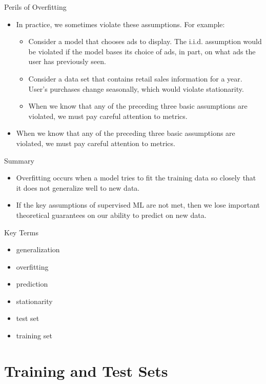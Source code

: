 \documentclass{beamer}
\begin{document}
\begin{frame}{Perils of Overfitting}
\begin{itemize}
    \item In practice, we sometimes violate these assumptions. For example:
    \begin{itemize}
        \item Consider a model that chooses ads to display. The i.i.d. assumption would be violated if the model bases its choice of ads, in part, on what ads the user has previously seen.
        \item Consider a data set that contains retail sales information for a year. User's purchases change seasonally, which would violate stationarity.
        \item When we know that any of the preceding three basic assumptions are violated, we must pay careful attention to metrics.
    \end{itemize}
    \item When we know that any of the preceding three basic assumptions are violated, we must pay careful attention to metrics.
\end{itemize}
\end{frame}

\begin{frame}{Summary}
\begin{itemize}
    \item Overfitting occurs when a model tries to fit the training data so closely that it does not generalize well to new data.
    \item If the key assumptions of supervised ML are not met, then we lose important theoretical guarantees on our ability to predict on new data.
\end{itemize}
\end{frame}

\begin{frame}{Key Terms}
\begin{itemize}
    \item generalization
    \item overfitting
\item prediction
\item stationarity
\item test set
\item training set

\end{itemize}
\end{frame}

\section{Training and Test Sets}
\end{document}
